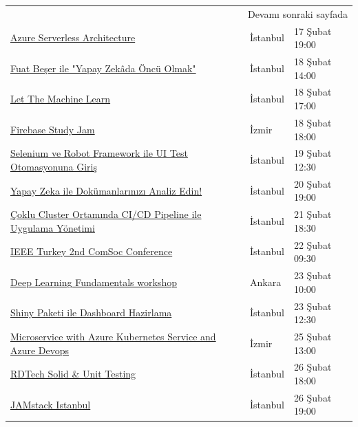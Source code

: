 \documentclass[11pt]{article}
\begin{document}
\begin{longtable}{|p{8cm}|l|l|}
\hline
\endhead
\hline\multicolumn{3}{r}{Devamı sonraki sayfada} \\
\endfoot
\endlastfoot
\hline
\href{https://www.meetup.com/Microsoft-Giri\%25C5\%259Fimcilik-Bulu\%25C5\%259Fmalar\%25C4\%25B1/events/268435933/}{Azure Serverless Architecture} & İstanbul & 17 Şubat 19:00\\
\href{https://www.meetup.com/istanbul-yapay-zeka-toplulugu/events/268718822/}{Fuat Beşer ile "Yapay Zekâda Öncü Olmak"} & İstanbul & 18 Şubat 14:00\\
\href{https://www.meetup.com/istanbul-yapay-zeka-toplulugu/events/268768436/}{Let The Machine Learn} & İstanbul & 18 Şubat 17:00\\
\href{https://www.meetup.com/GDG-Cloud-Izmir/events/268271805/}{Firebase Study Jam} & İzmir & 18 Şubat 18:00\\
\href{https://www.meetup.com/Teknopark-\%25C4\%25B0stanbul-Yaz\%25C4\%25B1l\%25C4\%25B1mc\%25C4\%25B1-Bulu\%25C5\%259Fmalar\%25C4\%25B1/events/268624461/}{Selenium ve Robot Framework ile UI Test Otomasyonuna Giriş} & İstanbul & 19 Şubat 12:30\\
\href{https://www.meetup.com/IBMDeveloperTR/events/268626077/}{Yapay Zeka ile Dokümanlarınızı Analiz Edin!} & İstanbul & 20 Şubat 19:00\\
\href{https://kommunity.com/devnot-yazilimci-bulusmalari/events/coklu-cluster-ortaminda-cicd-pipeline-ile-uygulama-yonetimi}{Çoklu Cluster Ortamında CI/CD Pipeline ile Uygulama Yönetimi} & İstanbul & 21 Şubat 18:30\\
\href{https://www.eventbrite.com/e/ieee-turkey-2nd-comsoc-conference-tickets-94153113497}{IEEE Turkey 2nd ComSoc Conference} & İstanbul & 22 Şubat 09:30\\
\href{https://www.eventbrite.com/e/deep-learning-fundamentals-workshop-tickets-94146818669}{Deep Learning Fundamentals workshop} & Ankara & 23 Şubat 10:00\\
\href{https://www.meetup.com/rladies-istanbul/events/268481383/}{Shiny Paketi ile Dashboard Hazirlama} & İstanbul & 23 Şubat 12:30\\
\href{https://www.meetup.com/Microsoft-Giri\%25C5\%259Fimcilik-Bulu\%25C5\%259Fmalar\%25C4\%25B1/events/268504659/}{Microservice with Azure Kubernetes Service and Azure Devops} & İzmir & 25 Şubat 13:00\\
\href{https://www.eventbrite.co.uk/e/rdtech-registration-94626158387}{RDTech Solid \& Unit Testing} & İstanbul & 26 Şubat 18:00\\
\href{https://kommunity.com/jamstack/events/jamstack-istanbul}{JAMstack Istanbul} & İstanbul & 26 Şubat 19:00\\

\end{longtable}
\end{document}
